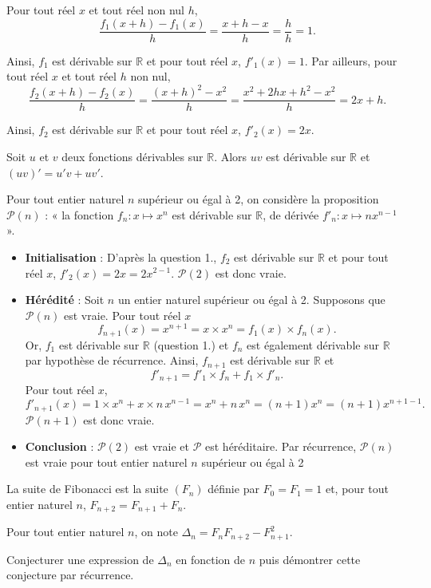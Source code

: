 \documentclass[11pt,fleqn]{book} %
\begin{document}
\begin{solution} Pour tout réel \(x\) et tout réel non nul \(h\),
\[ \dfrac{f_1(x+h) - f_1(x)}{h}=\dfrac{x+h-x}{h} = \dfrac{h}{h}=1.\]

Ainsi, \(f_1\) est dérivable sur \(\mathbb{R}\) et pour tout réel \(x\), \(f'_1(x)=1\). Par ailleurs, pour tout réel \(x\) et tout réel \(h\) non nul,
\[\dfrac{f_2(x+h)-f_2(x)}{h}=\dfrac{(x+h)^2-x^2}{h}=\dfrac{x^2+2hx+h^2-x^2}{h}=2x+h.\]

Ainsi, \(f_2\) est dérivable sur \(\mathbb{R}\) et pour tout réel \(x\), \(f'_2(x)=2x\).

Soit \(u\) et \(v\) deux fonctions dérivables sur \(\mathbb{R}\). Alors \(uv\) est dérivable sur \(\mathbb{R}\) et \((uv)'=u'v+uv'\).

Pour tout entier naturel \(n\) supérieur ou égal à 2, on considère la proposition \( \mathcal{P}(n)\) : « la fonction \(f_n : x \mapsto x^n\) est dérivable sur \(\mathbb{R}\), de dérivée \(f'_n : x \mapsto nx^{n-1}\) ».
\begin{itemize} \item \textbf{Initialisation} : D'après la question 1., \(f_2\) est dérivable sur \(\mathbb{R}\) et pour tout réel \(x\), \(f'_2(x)=2x=2x^{2-1}\). \(\mathcal{P}(2)\) est donc vraie.
\item \textbf{Hérédité} : Soit \(n\) un entier naturel supérieur ou égal à 2. Supposons que \( \mathcal{P}(n)\) est vraie. Pour tout réel \(x\)\[ f_{n+1}(x) = x^{n+1} = x \times x^n = f_1(x) \times f_n(x) .\]
Or, \(f_1\) est dérivable sur \(\mathbb{R}\) (question 1.) et \(f_n\) est également dérivable sur \(\mathbb{R}\) par hypothèse de récurrence. Ainsi, \(f_{n+1}\) est dérivable sur \(\mathbb{R}\) et
\[f'_{n+1}=f'_1 \times f_n + f_1 \times f'_n.\]
Pour tout réel \(x\),
\[ f'_{n+1}(x)= 1 \times x^n + x \times n\,x^{n-1} = x^n+n\,x^n=(n+1)x^n=(n+1) x^{n+1-1}.\]
\(\mathcal{P}(n+1)\) est donc vraie.
\item \textbf{Conclusion} : \(\mathcal{P}(2)\) est vraie et \(\mathcal{P}\) est héréditaire. Par récurrence, \(\mathcal{P}(n)\) est vraie pour tout entier naturel \(n\) supérieur ou égal à 2\end{itemize}\end{solution}

\begin{exercise}La suite de Fibonacci est la suite $(F_n)$ définie par $F_0=F_1=1$ et, pour tout entier naturel $n$, $F_{n+2}=F_{n+1}+F_n$.

Pour tout entier naturel $n$, on note $\Delta_n=F_nF_{n+2}-F_{n+1}^2$.

Conjecturer une expression de $\Delta_n$ en fonction de $n$ puis démontrer cette conjecture par récurrence.\end{exercise}
\end{document}

